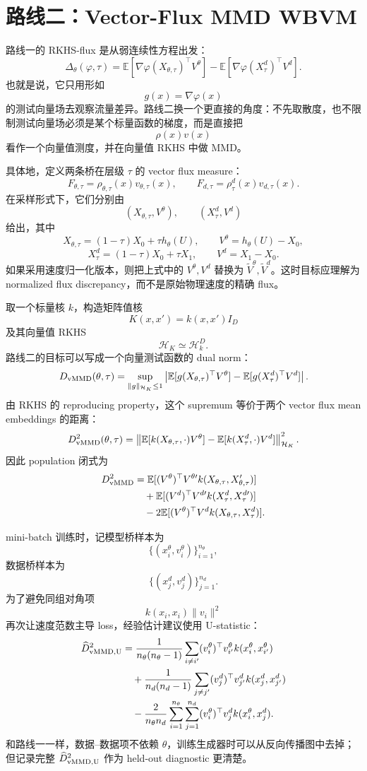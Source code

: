 \documentclass[UTF8,11pt]{ctexart}
\newcommand{\E}{\mathbb{E}}
\newcommand{\cH}{\mathcal{H}}
\begin{document}
\section{路线二：Vector-Flux MMD WBVM}

路线一的 RKHS-flux 是从弱连续性方程出发：
\[
\Delta_\theta(\varphi,\tau)
=
\E[\nabla\varphi(X_{\theta,\tau})^\top V^\theta]
-
\E[\nabla\varphi(X_\tau^d)^\top V^d].
\]
也就是说，它只用形如
\[
g(x)=\nabla\varphi(x)
\]
的测试向量场去观察流量差异。路线二换一个更直接的角度：不先取散度，也不限制测试向量场必须是某个标量函数的梯度，而是直接把
\[
\rho(x)v(x)
\]
看作一个向量值测度，并在向量值 RKHS 中做 MMD。

具体地，定义两条桥在层级 \(\tau\) 的 vector flux measure：
\[
F_{\theta,\tau}=\rho_{\theta,\tau}(x)v_{\theta,\tau}(x),
\qquad
F_{d,\tau}=\rho_\tau^d(x)v_{d,\tau}(x).
\]
在采样形式下，它们分别由
\[
(X_{\theta,\tau},V^\theta),
\qquad
(X_\tau^d,V^d)
\]
给出，其中
\[
X_{\theta,\tau}=(1-\tau)X_0+\tau h_\theta(U),
\qquad
V^\theta=h_\theta(U)-X_0,
\]
\[
X_\tau^d=(1-\tau)X_0+\tau X_1,
\qquad
V^d=X_1-X_0.
\]
如果采用速度归一化版本，则把上式中的 \(V^\theta,V^d\) 替换为
\(\widetilde V^\theta,\widetilde V^d\)。这时目标应理解为 normalized flux discrepancy，而不是原始物理速度的精确 flux。

取一个标量核 \(k\)，构造矩阵值核
\[
K(x,x')=k(x,x')I_D
\]
及其向量值 RKHS
\[
\cH_K\simeq \cH_k^D .
\]
路线二的目标可以写成一个向量测试函数的 dual norm：
\[
D_{\rm vMMD}(\theta,\tau)
=
\sup_{\|g\|_{\cH_K}\le 1}
\left|
\E[g(X_{\theta,\tau})^\top V^\theta]
-
\E[g(X_\tau^d)^\top V^d]
\right|.
\]
由 RKHS 的 reproducing property，这个 supremum 等价于两个 vector flux mean embeddings 的距离：
\[
D_{\rm vMMD}^2(\theta,\tau)
=
\left\|
\E[k(X_{\theta,\tau},\cdot)V^\theta]
-
\E[k(X_\tau^d,\cdot)V^d]
\right\|_{\cH_K}^2.
\]
因此 population 闭式为
\[
\begin{aligned}
D_{\rm vMMD}^2
&=
\E[(V^\theta)^\top V^{\theta\prime}
k(X_{\theta,\tau},X_{\theta,\tau}')]
\\
&\quad+
\E[(V^d)^\top V^{d\prime}
k(X_\tau^d,X_\tau^{d\prime})]
\\
&\quad-
2\E[(V^\theta)^\top V^d
k(X_{\theta,\tau},X_\tau^d)].
\end{aligned}
\]

mini-batch 训练时，记模型桥样本为
\[
\{(x_i^\theta,v_i^\theta)\}_{i=1}^{n_\theta},
\]
数据桥样本为
\[
\{(x_j^d,v_j^d)\}_{j=1}^{n_d}.
\]
为了避免同组对角项
\[
k(x_i,x_i)\|v_i\|^2
\]
再次让速度范数主导 loss，经验估计建议使用 U-statistic：
\[
\begin{aligned}
\widehat D_{\rm vMMD,U}^2
&=
\frac{1}{n_\theta(n_\theta-1)}
\sum_{i\ne i'}
(v_i^\theta)^\top v_{i'}^\theta
k(x_i^\theta,x_{i'}^\theta)
\\
&\quad+
\frac{1}{n_d(n_d-1)}
\sum_{j\ne j'}
(v_j^d)^\top v_{j'}^d
k(x_j^d,x_{j'}^d)
\\
&\quad-
\frac{2}{n_\theta n_d}
\sum_{i=1}^{n_\theta}\sum_{j=1}^{n_d}
(v_i^\theta)^\top v_j^d
k(x_i^\theta,x_j^d).
\end{aligned}
\]
和路线一一样，数据--数据项不依赖 \(\theta\)，训练生成器时可以从反向传播图中去掉；但记录完整
\(\widehat D_{\rm vMMD,U}^2\) 作为 held-out diagnostic 更清楚。
\end{document}
